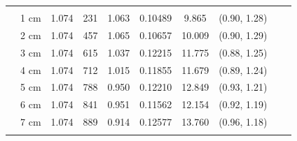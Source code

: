 \documentclass[a4paper 12pt]{article}
\numberwithin{equation}{section}
\begin{document}
\begin{small}
\begin{table}[h!]
\begin{footnotesize}
\begin{tabular}{clclclclcl}
 \raisebox{1ex}{\bf age 6+}  \\ [1.0ex]
&   1 cm & 1.074 &  231 &  1.063 &           0.10489& 9.865  & (0.90, 1.28)\\
&   2 cm & 1.074 &  457 &  1.065 &           0.10657& 10.009 & (0.90, 1.29)\\
&   3 cm & 1.074 &  615 &  1.037 &           0.12215& 11.775 & (0.88, 1.25)\\
&   4 cm & 1.074 &  712 &  1.015 &           0.11855& 11.679 & (0.89, 1.24)\\
&   5 cm & 1.074 &  788 &  0.950 &           0.12210& 12.849 & (0.93, 1.21)\\
&   6 cm & 1.074 &  841 &  0.951 &           0.11562& 12.154 & (0.92, 1.19)\\
&   7 cm & 1.074 &  889 &  0.914 &           0.12577& 13.760 & (0.96, 1.18) \\[1.5ex]
  \hline \\
\end{tabular}
\end{footnotesize}
\end{table}
 \end{small}
\end{document}
